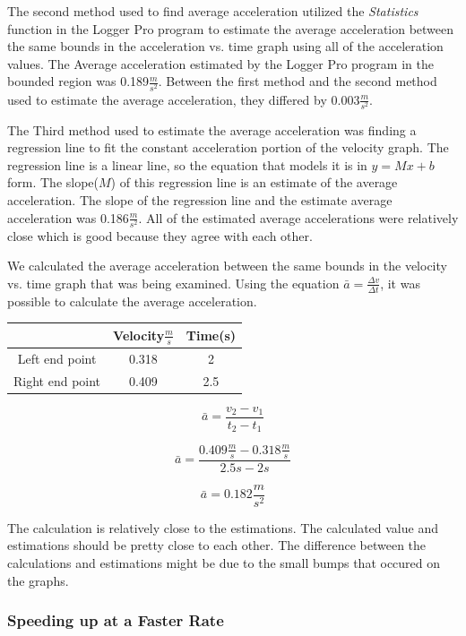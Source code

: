 \documentclass[aps,letterpaper,11pt]{revtex4}
\begin{document}
\newpage

The second method used to find average acceleration utilized the \textit{Statistics} function in the Logger Pro program to estimate the average acceleration between the same bounds in the acceleration vs. time graph using all of the acceleration values. The Average acceleration estimated by the Logger Pro program in the bounded region was 0.189$\frac{m}{s^2}$. Between the first method and the second method used to estimate the average acceleration, they differed by 0.003$\frac{m}{s^2}$. 

The Third method used to estimate the average acceleration was finding a regression line to fit the constant acceleration portion of the velocity graph. The regression line is a linear line, so the equation that models it is in $y = Mx + b$ form. The slope($M$) of this regression line is an estimate of the average acceleration. The slope of the regression line and the estimate average acceleration was 0.186$\frac{m}{s^2}$. All of the estimated average accelerations were relatively close which is good because they agree with each other. 

We calculated the average acceleration between the same bounds in the velocity vs. time graph that was being examined. Using the equation $\bar{a} = \frac{\Delta v}{\Delta t}$, it was possible to calculate the average acceleration. 

\begin{center}
\begin{tabular}{|c|c|c|}
\hline
  & Velocity$\frac{m}{s}$ & Time(s) \\
\hline
Left end point & 0.318 & 2 \\
\hline
Right end point & 0.409 & 2.5 \\
\hline  
\end{tabular}
\end{center}

\[ \bar{a} = \frac{v_2 - v_1}{t_2 - t_1}\]

\[ \bar{a} = \frac{0.409\frac{m}{s} - 0.318\frac{m}{s}}{2.5s - 2s}\]

\[ \boxed{\bar{a} = 0.182\frac{m}{s^2}}\]

The calculation is relatively close to the estimations. The calculated value and estimations should be pretty close to each other. The difference between the calculations and estimations might be due to the small bumps that occured on the graphs. 

\subsubsection{Speeding up at a Faster Rate}
\end{document}
